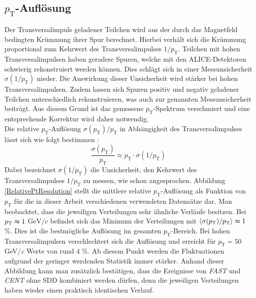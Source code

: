 \documentclass[12pt,a4paper]{report}
\begin{document}
\subsection{$p_{\mathrm{T}}$-Auflösung}
Der Transversalimpuls geladener Teilchen wird aus der durch das Magnetfeld bedingten Krümmung ihrer Spur berechnet. Hierbei verhält sich die Krümmung proportional zum Kehrwert des Transversalimpulses $1/p_{\mathrm{T}}$. Teilchen mit hohen Transversalimpulsen haben geradere Spuren, welche mit den ALICE-Detektoren schwierig rekonstruiert werden können. Dies schlägt sich in einer Messunsicherheit $\sigma(1/p_{\mathrm{T}})$ nieder. Die Auswirkung dieser Unsicherheit wird stärker bei hohen Transversalimpulsen. Zudem lassen sich Spuren positiv und negativ geladener Teilchen unterschiedlich rekonstruieren, was auch zur genannten Messunsicherheit beiträgt. Aus diesem Grund ist das gemessene $p_{\mathrm{T}}$-Spektrum verschmiert und eine entsprechende Korrektur wird daher notwendig.\\
Die relative $p_{\mathrm{T}}$-Auflösung $\sigma(p_{\mathrm{T}})/p_{\mathrm{T}}$ in Abhängigkeit des Transversalimpulses lässt sich wie folgt bestimmen \cite{knichel2015transverse}:
\begin{equation} \label{eq:RelativePtResolution}
  \dfrac{\sigma(p_{\mathrm{T}})}{p_{\mathrm{T}}} \approx p_{\mathrm{T}} \cdot \sigma(1/p_{\mathrm{T}})
\end{equation}
Dabei bezeichnet $\sigma(1/p_{\mathrm{T}})$ die Unsicherheit, den Kehrwert des Transversalimpulses $1/p_{\mathrm{T}}$ zu messen, wie schon angesprochen. Abbildung \ref{RelativePtResolution} stellt die mittlere relative $p_{\mathrm{T}}$-Auflösung als Funktion von $p_{\mathrm{T}}$ für die in dieser Arbeit verschiedenen verwendeten Datensätze dar. Man beobachtet, dass die jeweiligen Verteilungen sehr ähnliche Verläufe besitzen. Bei $p_{\mathrm{T}} \thickapprox 1$ $\mathrm{GeV}/c$ befindet sich das Minimum der Verteilungen mit $\left<\sigma(p_{\mathrm{T}})/p_{\mathrm{T}}\right> \thickapprox 1$ \%. Dies ist die bestmögliche Auflösung im gesamten $p_{\mathrm{T}}$-Bereich. Bei hohen Transversalimpulsen verschlechtert sich die Auflösung und erreicht für $p_{\mathrm{T}}=50$ GeV/\textit{c} Werte von rund $4$ \%. Ab diesem Punkt werden die Fluktuationen aufgrund der geringer werdenden Statistik immer stärker. Anhand dieser Abbildung kann man zusätzlich bestätigen, dass die Ereignisse von \textit{FAST} und \textit{CENT} ohne SDD kombiniert werden dürfen, denn die jeweiligen Verteilungen haben wieder einen praktisch identischen Verlauf.\\
\end{document}
